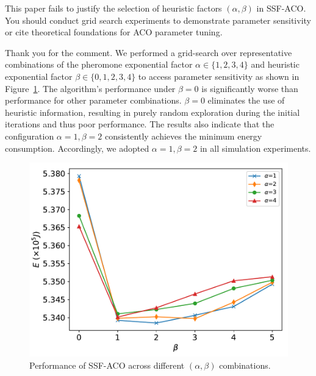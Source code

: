 \reviewer

\begin{revcomment}
	This paper fails to justify the selection of heuristic factors $(\alpha, \beta)$ in SSF-ACO. You should conduct grid search experiments to demonstrate parameter sensitivity or cite theoretical foundations for ACO parameter tuning.
\end{revcomment}
\begin{revresponse}
	Thank you for the comment.
	We performed a grid-search over representative combinations of the pheromone exponential factor $\alpha\in\{1,2,3,4\}$ and heuristic exponential factor $\beta\in\{0,1,2,3,4\}$ to access parameter sensitivity as shown in Figure~\ref{fig:cali}.
	The algorithm's performance under $\beta=0$ is significantly worse than performance for other parameter combinations. $\beta=0$ eliminates the use of heuristic information, resulting in purely random exploration during the initial iterations and thus poor performance.
	The results also indicate that the configuration $\alpha=1,\beta=2$ consistently achieves the minimum energy consumption. Accordingly, we adopted $\alpha=1,\beta=2$ in all simulation experiments.
	\begin{figure}[h]
		\centerline{\includegraphics[width=.6\textwidth]{fig/cali.pdf}}
		\caption{Performance of SSF-ACO across different $(\alpha,\beta)$ combinations.}
		\label{fig:cali}
	\end{figure}
\end{revresponse}

